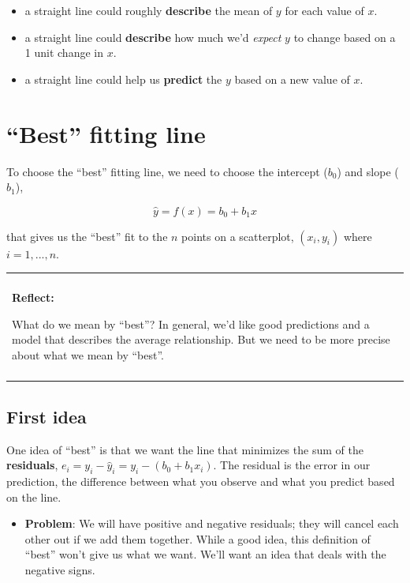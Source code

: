 \documentclass[]{book}
\providecommand{\tightlist}{%
  \setlength{\itemsep}{0pt}\setlength{\parskip}{0pt}}
\newenvironment{reflect}
{
    \begin{center}
    
    \begin{tabular}{|p{0.8\textwidth}|}
    \rowcolor{LightBlue}
    \hline\\
    \rowcolor{LightBlue}
    \textbf{Reflect:}
}
{
    \\\rowcolor{LightBlue}
    \\\hline
    \end{tabular} 
    \end{center}
}
\begin{document}
\begin{itemize}
\tightlist
\item
  a straight line could roughly \textbf{describe} the mean of \(y\) for each value of \(x\).
\item
  a straight line could \textbf{describe} how much we'd \emph{expect} \(y\) to change based on a 1 unit change in \(x\).
\item
  a straight line could help us \textbf{predict} the \(y\) based on a new value of \(x\).
\end{itemize}

\hypertarget{best-fitting-line}{%
\section{``Best'' fitting line}\label{best-fitting-line}}

To choose the ``best'' fitting line, we need to choose the intercept (\(b_0\)) and slope (\(b_1\)),

\[ \hat{y} = f(x) = b_0 + b_1x \]

that gives us the ``best'' fit to the \(n\) points on a scatterplot, \((x_i,y_i)\) where \(i=1,...,n\).

\begin{reflect}
What do we mean by ``best''? In general, we'd like good predictions and
a model that describes the average relationship. But we need to be more
precise about what we mean by ``best''.
\end{reflect}

\hypertarget{first-idea}{%
\subsection{First idea}\label{first-idea}}

One idea of ``best'' is that we want the line that minimizes the sum of the \textbf{residuals}, \(e_i = y_i - \hat{y}_i = y_i - ( b_0 + b_1x_i)\). The residual is the error in our prediction, the difference between what you observe and what you predict based on the line.

\begin{itemize}
\tightlist
\item
  \textbf{Problem}: We will have positive and negative residuals; they will cancel each other out if we add them together. While a good idea, this definition of ``best'' won't give us what we want. We'll want an idea that deals with the negative signs.
\end{itemize}
\end{document}
